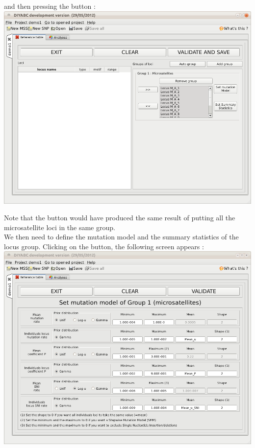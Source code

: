 and then pressing the \fbox{\textsf{$ >> $}} button : \\

\includegraphics[scale=0.35]{gui_pictures/Capture-DIYABC-18.png}

Note that the  button would have produced the same result of putting all the microsatellite loci in the same group.\\  

We then need to define the mutation model and the summary statistics of the locus group. Clicking on the  button, the following screen appears :\\

\includegraphics[scale=0.35]{gui_pictures/Capture-DIYABC-19.png} 

